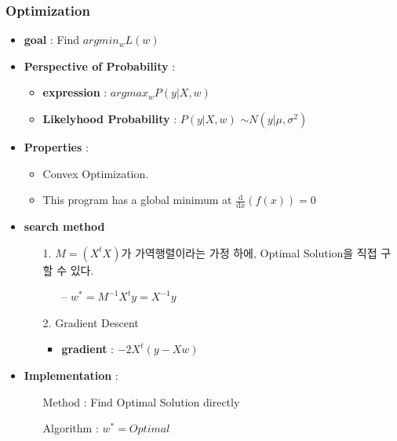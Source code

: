 \documentclass{article}
\begin{document}
\subsubsection{Optimization}
\begin{itemize}
    \item \textbf{goal} : Find $argmin_w L(w)$
    \item \textbf{Perspective of Probability} : 
         \begin{itemize}
             \item \textbf{expression} : $argmax_w P(y|X,w)$
             \item \textbf{Likelyhood Probability} : $P(y|X,w)$ $\sim N(y|\mu, {\sigma}^{2})$
         \end{itemize}
    \item \textbf{Properties} : 
    \begin{itemize}
        \item Convex Optimization.
        \item This program has a global minimum at $\frac{\mathrm d}{\mathrm d x} \left( f(x) \right)=0$
    \end{itemize}
    \item \textbf{search method}
    \begin{itemize}
        \item[1.] $M = (X^tX)$가 가역행렬이라는 가정 하에, Optimal Solution을 직접 구할 수 있다.
        \begin{itemize}
            \item[--] $w^* = M^{-1}X^{t}y = X^{-1}y$
        \end{itemize}
        
        \item[2.] Gradient Descent
        \begin{itemize}
            \item \textbf{gradient} : $-2X^t(y-Xw)$
        \end{itemize}
    \end{itemize}
    
    \item \textbf{Implementation} : 
        \begin{itemize}
            \item[Method] : Find Optimal Solution directly
            \item[Algorithm] : $w^* = Optimal$
        \end{itemize}
\end{itemize}
\end{document}
